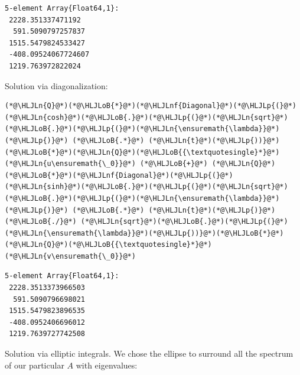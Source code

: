 \documentclass[12pt,a4paper]{article}
\newcommand{\HLJLn}[1]{#1}
\newcommand{\HLJLnf}[1]{\textcolor[RGB]{66,102,213}{#1}}
\newcommand{\HLJLoB}[1]{\textcolor[RGB]{102,102,102}{\textbf{#1}}}
\newcommand{\HLJLp}[1]{#1}
\begin{document}
\begin{lstlisting}
5-element Array{Float64,1}:
 2228.351337471192  
  591.5090797257837 
 1515.5479824533427 
 -408.09524067724607
 1219.763972822024
\end{lstlisting}


Solution via diagonalization:


\begin{lstlisting}
(*@\HLJLn{Q}@*)(*@\HLJLoB{*}@*)(*@\HLJLnf{Diagonal}@*)(*@\HLJLp{(}@*)(*@\HLJLn{cosh}@*)(*@\HLJLoB{.}@*)(*@\HLJLp{(}@*)(*@\HLJLn{sqrt}@*)(*@\HLJLoB{.}@*)(*@\HLJLp{(}@*)(*@\HLJLn{\ensuremath{\lambda}}@*)(*@\HLJLp{)}@*) (*@\HLJLoB{.*}@*) (*@\HLJLn{t}@*)(*@\HLJLp{))}@*)(*@\HLJLoB{*}@*)(*@\HLJLn{Q}@*)(*@\HLJLoB{{\textquotesingle}*}@*)(*@\HLJLn{u\ensuremath{\_0}}@*) (*@\HLJLoB{+}@*) (*@\HLJLn{Q}@*)(*@\HLJLoB{*}@*)(*@\HLJLnf{Diagonal}@*)(*@\HLJLp{(}@*)(*@\HLJLn{sinh}@*)(*@\HLJLoB{.}@*)(*@\HLJLp{(}@*)(*@\HLJLn{sqrt}@*)(*@\HLJLoB{.}@*)(*@\HLJLp{(}@*)(*@\HLJLn{\ensuremath{\lambda}}@*)(*@\HLJLp{)}@*) (*@\HLJLoB{.*}@*) (*@\HLJLn{t}@*)(*@\HLJLp{)}@*) (*@\HLJLoB{./}@*) (*@\HLJLn{sqrt}@*)(*@\HLJLoB{.}@*)(*@\HLJLp{(}@*)(*@\HLJLn{\ensuremath{\lambda}}@*)(*@\HLJLp{))}@*)(*@\HLJLoB{*}@*)(*@\HLJLn{Q}@*)(*@\HLJLoB{{\textquotesingle}*}@*)(*@\HLJLn{v\ensuremath{\_0}}@*)
\end{lstlisting}

\begin{lstlisting}
5-element Array{Float64,1}:
 2228.3513373966503
  591.5090796698021
 1515.5479823896535
 -408.0952406696012
 1219.7639727742508
\end{lstlisting}


Solution via elliptic integrals. We chose the ellipse to surround all the spectrum of our particular $A$ with eigenvalues:
\end{document}
